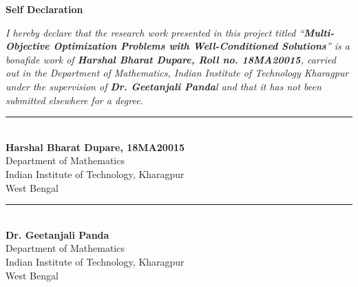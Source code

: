 \begin{center}
 {\huge \textbf{Self Declaration}}
\end{center}
\vspace*{0.3in}
\textit{
I hereby declare that the research work presented in this project titled ``\textbf{Multi-Objective Optimization Problems with Well-Conditioned Solutions}'' is a bonafide work of \textbf{Harshal Bharat Dupare, Roll no. 18MA20015}, carried out in the Department of Mathematics, Indian Institute of Technology Kharagpur under the supervision of \textbf{Dr. Geetanjali Panda}l and that it has not been submitted elsewhere for a degree.
}\\

\begin{flushright}
\vspace*{0.7in}
\par\noindent\rule{.5\textwidth}{1pt}\\
\textbf{Harshal Bharat Dupare, 18MA20015}\\
Department of Mathematics\\
Indian Institute of Technology, Kharagpur\\
West Bengal \\

\vspace*{0.7in}
\hfill \par\noindent\rule{.5\textwidth}{1pt}\\
\textbf{Dr. Geetanjali Panda}\\
\hfill Department of Mathematics\\
\hfill Indian Institute of Technology, Kharagpur\\ West Bengal\\
\end{flushright}

